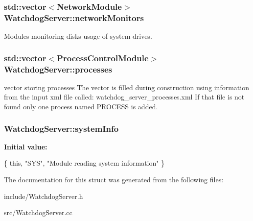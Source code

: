 \subsubsection[{\texorpdfstring{network\+Monitors}{networkMonitors}}]{\setlength{\rightskip}{0pt plus 5cm}std\+::vector$<${\bf Network\+Module}$>$ Watchdog\+Server\+::network\+Monitors}\hypertarget{structWatchdogServer_a9a96dd4fa6053b7b783e43c5d446d7f0}{}\label{structWatchdogServer_a9a96dd4fa6053b7b783e43c5d446d7f0}
Modules monitoring disks usage of system drives. 
\subsubsection[{\texorpdfstring{processes}{processes}}]{\setlength{\rightskip}{0pt plus 5cm}std\+::vector$<${\bf Process\+Control\+Module}$>$ Watchdog\+Server\+::processes}\hypertarget{structWatchdogServer_af21c89fb581f3f8ff9d3cf02509634c1}{}\label{structWatchdogServer_af21c89fb581f3f8ff9d3cf02509634c1}
vector storing processes The vector is filled during construction using information from the input xml file called\+: watchdog\+\_\+server\+\_\+processes.\+xml If that file is not found only one process named P\+R\+O\+C\+E\+SS is added. 
\subsubsection[{\texorpdfstring{system\+Info}{systemInfo}}]{ Watchdog\+Server\+::system\+Info}\hypertarget{structWatchdogServer_a433d3ce980aa862c0cf72ccec69846da}{}\label{structWatchdogServer_a433d3ce980aa862c0cf72ccec69846da}
{\bfseries Initial value\+:}
\begin{DoxyCode}
\{ \textcolor{keyword}{this}, \textcolor{stringliteral}{"SYS"},
      \textcolor{stringliteral}{"Module reading system information"} \}
\end{DoxyCode}


The documentation for this struct was generated from the following files\+:\begin{DoxyCompactItemize}
\item 
include/Watchdog\+Server.\+h\item 
src/Watchdog\+Server.\+cc\end{DoxyCompactItemize}
